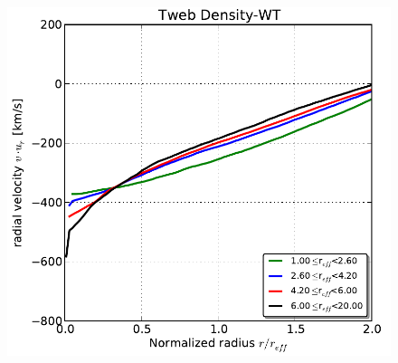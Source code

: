 \documentclass[a4,useAMS,usenatbib,usegraphicx]{latex/mn2e}
\begin{document}
\begin{flushleft}
\begin{figure}
  \includegraphics[trim = 1mm 2mm 4mm 0mm, clip, keepaspectratio=true,
  width=0.24\textheight]{./figures/voids_velocity_TwebDLG.pdf}
  

  \label{fig:VFF}
  \vspace{0.1 cm}

\end{figure}
\end{flushleft}
\end{document}
